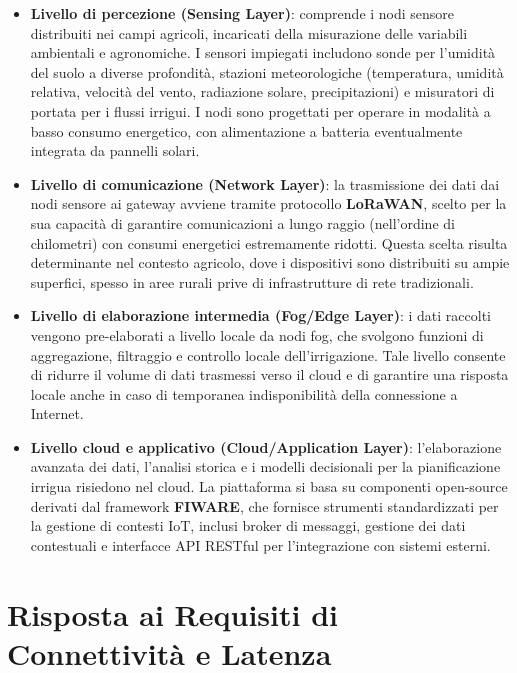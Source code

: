 \begin{itemize}
	\item \textbf{Livello di percezione (Sensing Layer)}: comprende i nodi sensore distribuiti nei campi agricoli, incaricati della misurazione delle variabili ambientali e agronomiche. I sensori impiegati includono sonde per l'umidità del suolo a diverse profondità, stazioni meteorologiche (temperatura, umidità relativa, velocità del vento, radiazione solare, precipitazioni) e misuratori di portata per i flussi irrigui. I nodi sono progettati per operare in modalità a basso consumo energetico, con alimentazione a batteria eventualmente integrata da pannelli solari.
	
	\item \textbf{Livello di comunicazione (Network Layer)}: la trasmissione dei dati dai nodi sensore ai gateway avviene tramite protocollo \textbf{LoRaWAN}, scelto per la sua capacità di garantire comunicazioni a lungo raggio (nell'ordine di chilometri) con consumi energetici estremamente ridotti. Questa scelta risulta determinante nel contesto agricolo, dove i dispositivi sono distribuiti su ampie superfici, spesso in aree rurali prive di infrastrutture di rete tradizionali.
	
	\item \textbf{Livello di elaborazione intermedia (Fog/Edge Layer)}: i dati raccolti vengono pre-elaborati a livello locale da nodi fog, che svolgono funzioni di aggregazione, filtraggio e controllo locale dell'irrigazione. Tale livello consente di ridurre il volume di dati trasmessi verso il cloud e di garantire una risposta locale anche in caso di temporanea indisponibilità della connessione a Internet.
	
	\item \textbf{Livello cloud e applicativo (Cloud/Application Layer)}: l'elaborazione avanzata dei dati, l'analisi storica e i modelli decisionali per la pianificazione irrigua risiedono nel cloud. La piattaforma si basa su componenti open-source derivati dal framework \textbf{FIWARE}, che fornisce strumenti standardizzati per la gestione di contesti IoT, inclusi broker di messaggi, gestione dei dati contestuali e interfacce API RESTful per l'integrazione con sistemi esterni.
\end{itemize}


\section{Risposta ai Requisiti di Connettività e Latenza}

